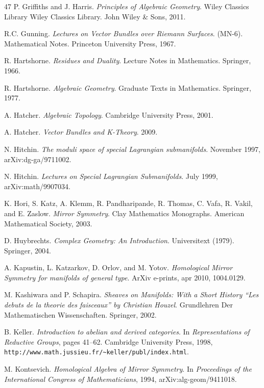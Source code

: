 \documentclass[11pt,a4paper]{article}
\theoremstyle{plain}
\theoremstyle{definition}
\begin{document}
\begin{thebibliography}{47}
 P. Griffiths and J. Harris. \emph{Principles of Algebraic Geometry}. Wiley Classics Library Wiley Classics Library. John Wiley \& Sons, 2011.

 R.C. Gunning. \emph{Lectures on Vector Bundles over Riemann Surfaces}. (MN-6). Mathematical Notes. Princeton University Press, 1967.

 R. Hartshorne. \emph{Residues and Duality}. Lecture Notes in Mathematics. Springer, 1966.

 R. Hartshorne. \emph{Algebraic Geometry}. Graduate Texts in Mathematics. Springer, 1977.

 A. Hatcher. \emph{Algebraic Topology}. Cambridge University Press, 2001.

 A. Hatcher. \emph{Vector Bundles and K-Theory}. 2009.

 N. Hitchin. \emph{The moduli space of special Lagrangian submanifolds}. November 1997, arXiv:dg-ga/9711002.

 N. Hitchin. \emph{Lectures on Special Lagrangian Submanifolds}. July 1999, arXiv:math/9907034.

 K. Hori, S. Katz, A. Klemm, R. Pandharipande, R. Thomas, C. Vafa, R. Vakil, and E. Zaslow. \emph{Mirror Symmetry}. Clay Mathematics Monographs. American Mathematical Society, 2003.

 D. Huybrechts. \emph{Complex Geometry: An Introduction}. Universitext (1979). Springer, 2004.

 A. Kapustin, L. Katzarkov, D. Orlov, and M. Yotov. \emph{Homological Mirror Symmetry for manifolds of general type}. ArXiv e-prints, apr 2010, 1004.0129.

 M. Kashiwara and P. Schapira. \emph{Sheaves on Manifolds: With a Short History ``Les debuts de la theorie des faisceaux'' by Christian Houzel}. Grundlehren Der Mathematischen Wissenschaften. Springer, 2002.

 B. Keller. \emph{Introduction to abelian and derived categories}. In \emph{Representations of Reductive Groups}, pages 41--62. Cambridge University Press, 1998, \texttt{http://www.math.jussieu.fr/\textasciitilde keller/publ/index.html}.

 M. Kontsevich. \emph{Homological Algebra of Mirror Symmetry}. In \emph{Proceedings of the International Congress of Mathematicians}, 1994, arXiv:alg-geom/9411018.


\end{thebibliography}
\end{document}
